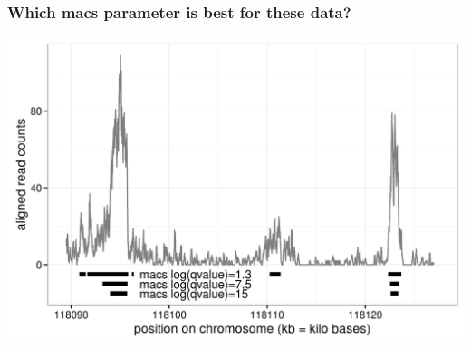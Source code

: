 \documentclass{beamer}
\begin{document}
 
\begin{frame}
  \frametitle{Which macs parameter is best for these data?}
  \includegraphics[width=1\textwidth]{figure-macs-problem.png}
\end{frame}
\end{document}
